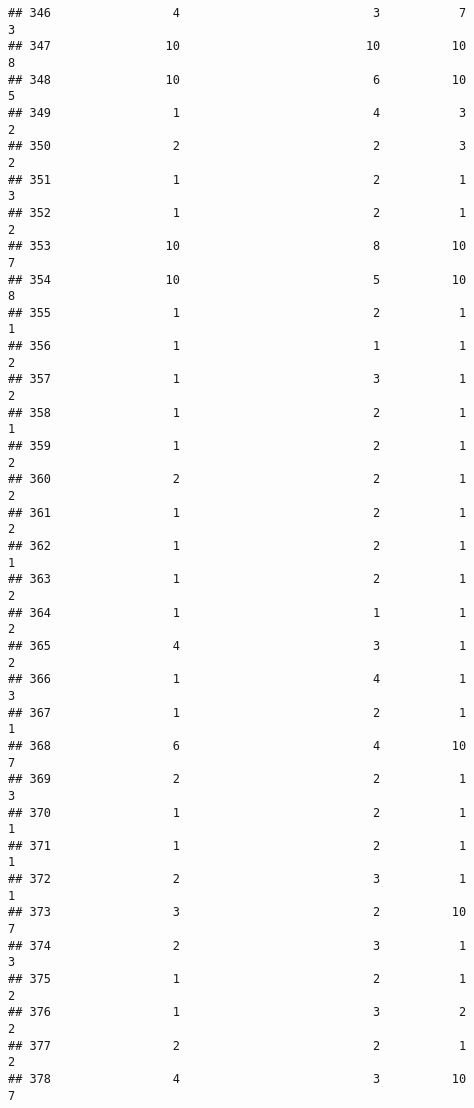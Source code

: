 \documentclass[
]{article}
\begin{document}
\begin{verbatim}
## 346                 4                           3           7               3
## 347                10                          10          10               8
## 348                10                           6          10               5
## 349                 1                           4           3               2
## 350                 2                           2           3               2
## 351                 1                           2           1               3
## 352                 1                           2           1               2
## 353                10                           8          10               7
## 354                10                           5          10               8
## 355                 1                           2           1               1
## 356                 1                           1           1               2
## 357                 1                           3           1               2
## 358                 1                           2           1               1
## 359                 1                           2           1               2
## 360                 2                           2           1               2
## 361                 1                           2           1               2
## 362                 1                           2           1               1
## 363                 1                           2           1               2
## 364                 1                           1           1               2
## 365                 4                           3           1               2
## 366                 1                           4           1               3
## 367                 1                           2           1               1
## 368                 6                           4          10               7
## 369                 2                           2           1               3
## 370                 1                           2           1               1
## 371                 1                           2           1               1
## 372                 2                           3           1               1
## 373                 3                           2          10               7
## 374                 2                           3           1               3
## 375                 1                           2           1               2
## 376                 1                           3           2               2
## 377                 2                           2           1               2
## 378                 4                           3          10               7

\end{verbatim}
\end{document}
